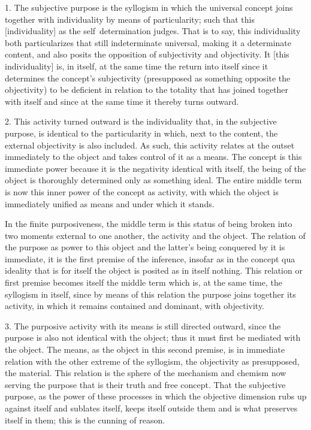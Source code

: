1. The subjective purpose is the syllogism in which the universal concept
joins together with individuality by means of particularity;
such that this [individuality] as the self~determination judges.
That is to say, this individuality both particularizes that still indeterminate universal,
making it a determinate content, and also posits the opposition of subjectivity and objectivity.
It [this individuality] is, in itself, at the same time the return
into itself since it determines the concept's subjectivity
(presupposed as something opposite the objectivity)
to be deficient in relation to the totality that has joined together
with itself and since at the same time it thereby turns outward.

2. This activity turned outward is the individuality that,
in the subjective purpose, is identical to the particularity
in which, next to the content, the external objectivity is also included.
As such, this activity relates at the outset immediately to the object and
takes control of it as a means.
The concept is this immediate power because it is
the negativity identical with itself,
the being of the object is thoroughly determined only as something ideal.
The entire middle term is now this inner power of the concept as activity,
with which the object is immediately unified as means and under which it stands.

    In the finite purposiveness, the middle term is this status of
    being broken into two moments external to one another,
    the activity and the object.
    The relation of the purpose as power to this object and
    the latter's being conquered by it is immediate,
    it is the first premise of the inference,
    insofar as in the concept qua ideality that is for itself
    the object is posited as in itself nothing.
    This relation or first premise becomes itself the middle term
    which is, at the same time, the syllogism in itself,
    since by means of this relation the purpose joins together its activity,
    in which it remains contained and dominant, with objectivity.

3. The purposive activity with its means is still directed outward,
since the purpose is also not identical with the object;
thus it must first be mediated with the object.
The means, as the object in this second premise, is in
immediate relation with the other extreme of the syllogism,
the objectivity as presupposed, the material.
This relation is the sphere of the mechanism and chemism
now serving the purpose that is their truth and free concept.
That the subjective purpose, as the power of these processes in which the
objective dimension rubs up against itself and sublates itself,
keeps itself outside them and is what preserves itself in them;
this is the cunning of reason.

